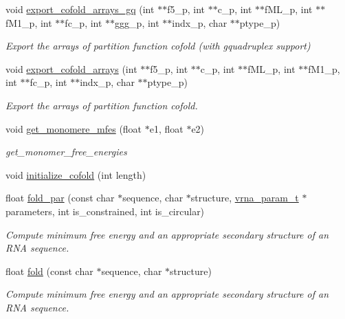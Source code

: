 \begin{DoxyCompactItemize}
void \hyperlink{group__mfe__global__deprecated_ga5f5bf4df35d0554f6ace9579f8744c48}{export\+\_\+cofold\+\_\+arrays\+\_\+gq} (int $\ast$$\ast$f5\+\_\+p, int $\ast$$\ast$c\+\_\+p, int $\ast$$\ast$f\+M\+L\+\_\+p, int $\ast$$\ast$f\+M1\+\_\+p, int $\ast$$\ast$fc\+\_\+p, int $\ast$$\ast$ggg\+\_\+p, int $\ast$$\ast$indx\+\_\+p, char $\ast$$\ast$ptype\+\_\+p)
\begin{DoxyCompactList}\small\item\em Export the arrays of partition function cofold (with gquadruplex support) \end{DoxyCompactList}\item 
void \hyperlink{group__mfe__global__deprecated_ga5cb6b59983f1f74ccc00b9b9c4e84482}{export\+\_\+cofold\+\_\+arrays} (int $\ast$$\ast$f5\+\_\+p, int $\ast$$\ast$c\+\_\+p, int $\ast$$\ast$f\+M\+L\+\_\+p, int $\ast$$\ast$f\+M1\+\_\+p, int $\ast$$\ast$fc\+\_\+p, int $\ast$$\ast$indx\+\_\+p, char $\ast$$\ast$ptype\+\_\+p)
\begin{DoxyCompactList}\small\item\em Export the arrays of partition function cofold. \end{DoxyCompactList}\item 
void \hyperlink{group__mfe__global__deprecated_ga4958b517c613e4d2afd5bce6c1060a79}{get\+\_\+monomere\+\_\+mfes} (float $\ast$e1, float $\ast$e2)
\begin{DoxyCompactList}\small\item\em get\+\_\+monomer\+\_\+free\+\_\+energies \end{DoxyCompactList}\item 
void \hyperlink{group__mfe__global__deprecated_gafee0c32208aa2ac97338b6e3fbad7fa5}{initialize\+\_\+cofold} (int length)
\item 
float \hyperlink{group__mfe__global__deprecated_ga2bc41df5d71fee6fd8da9904ee65d8fb}{fold\+\_\+par} (const char $\ast$sequence, char $\ast$structure, \hyperlink{group__energy__parameters_ga8a69ca7d787e4fd6079914f5343a1f35}{vrna\+\_\+param\+\_\+t} $\ast$parameters, int is\+\_\+constrained, int is\+\_\+circular)
\begin{DoxyCompactList}\small\item\em Compute minimum free energy and an appropriate secondary structure of an R\+NA sequence. \end{DoxyCompactList}\item 
float \hyperlink{group__mfe__global__deprecated_gaadafcb0f140795ae62e5ca027e335a9b}{fold} (const char $\ast$sequence, char $\ast$structure)
\begin{DoxyCompactList}\small\item\em Compute minimum free energy and an appropriate secondary structure of an R\+NA sequence. \end{DoxyCompactList}\item 
$$
\end{DoxyCompactItemize}
